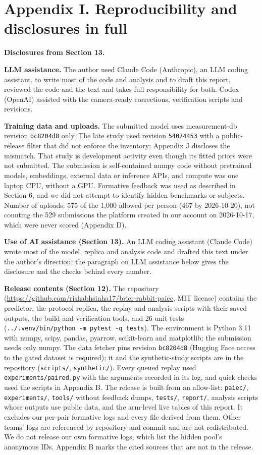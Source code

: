 \documentclass[
]{article}
\begin{document}
\section{Appendix I. Reproducibility and disclosures in
full}\label{appendix-i.-reproducibility-and-disclosures-in-full}

\textbf{Disclosures from Section 13.}

\textbf{LLM assistance.} The author used Claude Code (Anthropic), an LLM
coding assistant, to write most of the code and analysis and to draft
this report, reviewed the code and the text and takes full
responsibility for both. Codex (OpenAI) assisted with the camera-ready
corrections, verification scripts and revisions.

\textbf{Training data and uploads.} The submitted model uses
measurement-db revision \texttt{bc8204d8} only. The late study used
revision \texttt{54074453} with a public-release filter that did not
enforce the inventory; Appendix J discloses the mismatch. That study is
development activity even though its fitted priors were not submitted.
The submission is self-contained numpy code without pretrained models,
embeddings, external data or inference APIs, and compute was one laptop
CPU, without a GPU. Formative feedback was used as described in Section
6, and we did not attempt to identify hidden benchmarks or subjects.
Number of uploads: 575 of the 1,000 allowed per person (467 by
2026-10-20), not counting the 529 submissions the platform created in
our account on 2026-10-17, which were never scored (Appendix D).

\textbf{Use of AI assistance (Section 13).} An LLM coding assistant
(Claude Code) wrote most of the model, replica and analysis code and
drafted this text under the author's direction; the paragraph on LLM
assistance below gives the disclosure and the checks behind every
number.

\textbf{Release contents (Section 12).} The repository
(\url{https://github.com/rishabhsinha17/brier-rabbit-paiec}, MIT
license) contains the predictor, the protocol replica, the replay and
analysis scripts with their saved outputs, the build and verification
tools, and 26 unit tests
(\texttt{../.venv/bin/python\ -m\ pytest\ -q\ tests}). The environment
is Python 3.11 with numpy, scipy, pandas, pyarrow, scikit-learn and
matplotlib; the submission needs only numpy. The data fetcher pins
revision \texttt{bc8204d8} (Hugging Face access to the gated dataset is
required); it and the synthetic-study scripts are in the repository
(\texttt{scripts/}, \texttt{synthetic/}). Every queued replay used
\texttt{experiments/paired.py} with the arguments recorded in its log,
and quick checks used the scripts in Appendix B. The release is built
from an allow-list: \texttt{paiec/}, \texttt{experiments/},
\texttt{tools/} without feedback dumps, \texttt{tests/},
\texttt{report/}, analysis scripts whose outputs use public data, and
the arm-level live tables of this report. It excludes our per-pair
formative logs and every file derived from them. Other teams' logs are
referenced by repository and commit and are not redistributed. We do not
release our own formative logs, which list the hidden pool's anonymous
IDs. Appendix B marks the cited sources that are not in the release.
\end{document}

